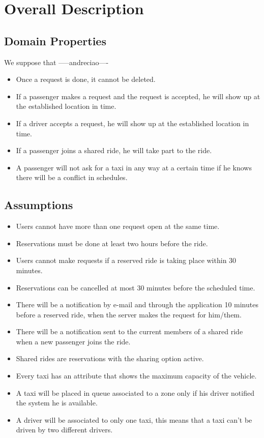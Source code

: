 \section{Overall Description}

\subsection{Domain Properties}
We suppose that -----andreciao----
\begin{itemize}
	\item Once a request is done, it cannot be deleted.
	\item If a passenger makes a request and the request is accepted, he will show up at the established location in time.
	\item If a driver accepts a request, he will show up at the established location in time.
	\item If a passenger joins a shared ride, he will take part to the ride.
	\item A passenger will not ask for a taxi in any way at a certain time if he knows there will be a conflict in schedules.
	\end{itemize}
	
	\subsection{Assumptions}
	\begin{itemize}
		\item Users cannot have more than one request open at the same time.
		\item Reservations must be done at least two hours before the ride.
		\item Users cannot make requests if a reserved ride is taking place within 30 minutes.
		\item Reservations can be cancelled at most 30 minutes before the scheduled time.
		\item There will be a notification by e-mail and through the application 10 minutes before a reserved ride, when the server makes the request for him/them.
		\item There will be a notification sent to  the current members of a shared ride when a new passenger joins the ride.
		\item Shared rides are reservations with the sharing option active.
		\item Every taxi has an attribute that shows the maximum capacity of the vehicle.
		\item A taxi will be placed in queue associated to a zone only if his driver notified the system he is available.
		\item A driver will be associated to only one taxi, this means that a taxi can't be driven by two different drivers.
		
		\end{itemize}
	
